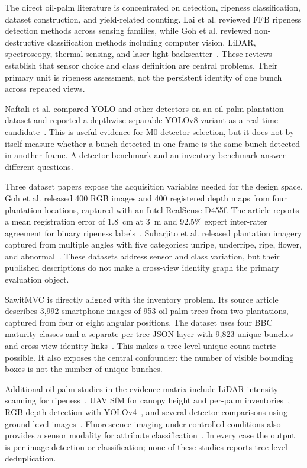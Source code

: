 The direct oil-palm literature is concentrated on detection, ripeness classification, dataset construction, and yield-related counting. Lai et al. reviewed FFB ripeness detection methods across sensing families, while Goh et al. reviewed non-destructive classification methods including computer vision, LiDAR, spectroscopy, thermal sensing, and laser-light backscatter~\cite{lai2023palmslr,goh2025palmreview}. These reviews establish that sensor choice and class definition are central problems. Their primary unit is ripeness assessment, not the persistent identity of one bunch across repeated views.

Naftali et al. compared YOLO and other detectors on an oil-palm plantation dataset and reported a depthwise-separable YOLOv8 variant as a real-time candidate~\cite{naftali2024palmcounter}. This is useful evidence for M0 detector selection, but it does not by itself measure whether a bunch detected in one frame is the same bunch detected in another frame. A detector benchmark and an inventory benchmark answer different questions.

Three dataset papers expose the acquisition variables needed for the design space. Goh et al. released 400 RGB images and 400 registered depth maps from four plantation locations, captured with an Intel RealSense D455f. The article reports a mean registration error of 1.8~cm at 3~m and 92.5\% expert inter-rater agreement for binary ripeness labels~\cite{goh2025palmdataset}. Suharjito et al. released plantation imagery captured from multiple angles with five categories: unripe, underripe, ripe, flower, and abnormal~\cite{suharjito2025palmdataset}. These datasets address sensor and class variation, but their published descriptions do not make a cross-view identity graph the primary evaluation object.

SawitMVC is directly aligned with the inventory problem. Its source article describes 3,992 smartphone images of 953 oil-palm trees from two plantations, captured from four or eight angular positions. The dataset uses four BBC maturity classes and a separate per-tree JSON layer with 9,823 unique bunches and cross-view identity links~\cite{indriani2026sawitmvc}. This makes a tree-level unique-count metric possible. It also exposes the central confounder: the number of visible bounding boxes is not the number of unique bunches.

Additional oil-palm studies in the evidence matrix include LiDAR-intensity scanning for ripeness~\cite{ledger_r_97003608b250cdc5}, UAV SfM for canopy height and per-palm inventories~\cite{ledger_m_084cfd5badbb63d3}, RGB-depth detection with YOLOv4~\cite{lai2022yolov4palm}, and several detector comparisons using ground-level images~\cite{ledger_r_19d96439ecdda18d,chen2022ffbdet,ledger_r_134385f2faed38a6}. Fluorescence imaging under controlled conditions also provides a sensor modality for attribute classification~\cite{ledger_r_1c81e223679e4bfe}. In every case the output is per-image detection or classification; none of these studies reports tree-level deduplication.

